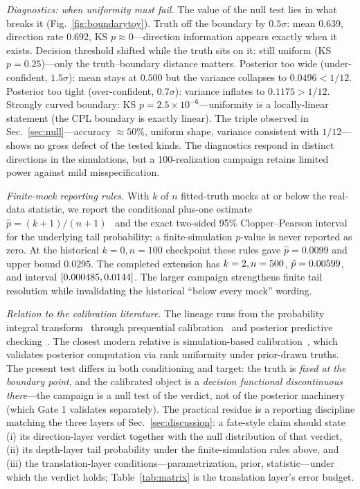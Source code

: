 \documentclass[a4paper,11pt]{article}
\begin{document}
\emph{Diagnostics: when uniformity must fail.} The value of the null test
lies in what breaks it (Fig.~\ref{fig:boundarytoy}). Truth off the
boundary by $0.5\sigma$: mean $0.639$, direction rate $0.692$, KS
$p\approx0$---direction information appears exactly when it exists.
Decision threshold shifted while the truth sits on it: still uniform (KS
$p=0.25$)---only the truth--boundary distance matters. Posterior too wide
(under-confident, $1.5\sigma$): mean stays at $0.500$ but the variance
collapses to $0.0496<1/12$. Posterior too tight (over-confident,
$0.7\sigma$): variance inflates to $0.1175>1/12$. Strongly curved
boundary: KS $p=2.5\times10^{-6}$---uniformity is a locally-linear
statement (the CPL boundary is exactly linear). The triple observed in
Sec.~\ref{sec:null}---accuracy $\approx50\%$, uniform shape, variance
consistent with $1/12$---shows no gross defect of the tested kinds. The
diagnostics respond in distinct directions in the simulations, but a
100-realization campaign retains limited power against mild misspecification.

\emph{Finite-mock reporting rules.} With $k$
of $n$ fitted-truth mocks at or below the real-data statistic, we report the conditional plus-one
estimate $\hat{p}=(k+1)/(n+1)$~\cite{PhipsonSmyth2010} and the exact
two-sided 95\% Clopper--Pearson interval for the underlying tail probability;
a finite-simulation $p$-value is never reported as zero. At the historical
$k=0,n=100$ checkpoint these rules gave $\hat p=0.0099$ and upper bound
$0.0295$. The completed extension has $k=2,n=500$,
$\hat p=0.00599$, and interval
$[0.000485,0.0144]$. The larger campaign strengthens finite
tail resolution while invalidating the historical ``below every mock''
wording.

\emph{Relation to the calibration literature.} The lineage runs from the
probability integral transform~\cite{Rosenblatt1952} through prequential
calibration~\cite{Dawid1984} and posterior predictive
checking~\cite{Rubin1984,GelmanMengStern1996}. The closest modern relative
is simulation-based calibration~\cite{Talts2018}, which validates posterior
computation via rank uniformity under prior-drawn truths. The present test
differs in both conditioning and target: the truth is \emph{fixed at the
boundary point}, and the calibrated object is a \emph{decision functional
discontinuous there}---the campaign is a null test of the verdict, not of
the posterior machinery (which Gate 1 validates separately). The practical
residue is a reporting discipline matching the three layers of
Sec.~\ref{sec:discussion}: a fate-style claim should state (i) its
direction-layer verdict together with the null distribution of that
verdict, (ii) its depth-layer tail probability under the finite-simulation
rules above, and (iii) the translation-layer conditions---parametrization,
prior, statistic---under which the verdict holds; Table~\ref{tab:matrix}
is the translation layer's error budget.
\end{document}
